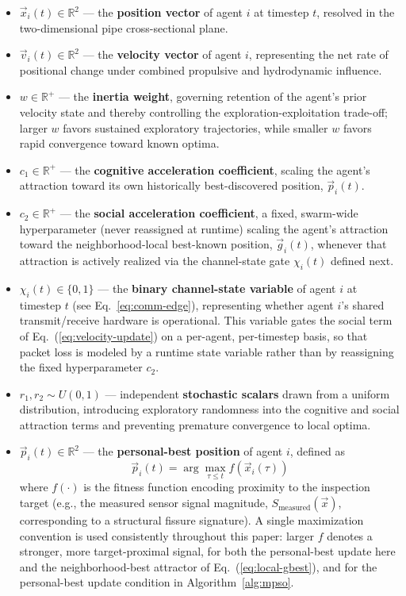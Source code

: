 \documentclass[journal]{IEEEtran}
\begin{document}
\begin{itemize}
    \item $\vec{x}_i(t) \in \mathbb{R}^2$ --- the \textbf{position vector} of agent $i$ at timestep $t$, resolved in the two-dimensional pipe cross-sectional plane.
    \item $\vec{v}_i(t) \in \mathbb{R}^2$ --- the \textbf{velocity vector} of agent $i$, representing the net rate of positional change under combined propulsive and hydrodynamic influence.
    \item $w \in \mathbb{R}^{+}$ --- the \textbf{inertia weight}, governing retention of the agent's prior velocity state and thereby controlling the exploration-exploitation trade-off; larger $w$ favors sustained exploratory trajectories, while smaller $w$ favors rapid convergence toward known optima.
    \item $c_1 \in \mathbb{R}^{+}$ --- the \textbf{cognitive acceleration coefficient}, scaling the agent's attraction toward its own historically best-discovered position, $\vec{p}_i(t)$.
    \item $c_2 \in \mathbb{R}^{+}$ --- the \textbf{social acceleration coefficient}, a fixed, swarm-wide hyperparameter (never reassigned at runtime) scaling the agent's attraction toward the neighborhood-local best-known position, $\vec{g}_i(t)$, whenever that attraction is actively realized via the channel-state gate $\chi_i(t)$ defined next.
    \item $\chi_i(t) \in \{0,1\}$ --- the \textbf{binary channel-state variable} of agent $i$ at timestep $t$ (see Eq.~\ref{eq:comm-edge}), representing whether agent $i$'s shared transmit/receive hardware is operational. This variable gates the social term of Eq.~(\ref{eq:velocity-update}) on a per-agent, per-timestep basis, so that packet loss is modeled by a runtime state variable rather than by reassigning the fixed hyperparameter $c_2$.
    \item $r_1, r_2 \sim U(0,1)$ --- independent \textbf{stochastic scalars} drawn from a uniform distribution, introducing exploratory randomness into the cognitive and social attraction terms and preventing premature convergence to local optima.
    \item $\vec{p}_i(t) \in \mathbb{R}^2$ --- the \textbf{personal-best position} of agent $i$, defined as
    \begin{equation}
    \vec{p}_i(t) = \arg\max_{\tau \le t} f\left(\vec{x}_i(\tau)\right)
    \end{equation}
    where $f(\cdot)$ is the fitness function encoding proximity to the inspection target (e.g., the measured sensor signal magnitude, $S_{\text{measured}}(\vec{x})$, corresponding to a structural fissure signature). A single maximization convention is used consistently throughout this paper: larger $f$ denotes a stronger, more target-proximal signal, for both the personal-best update here and the neighborhood-best attractor of Eq.~(\ref{eq:local-gbest}), and for the personal-best update condition in Algorithm~\ref{alg:mpso}.

\end{itemize}
\end{document}
